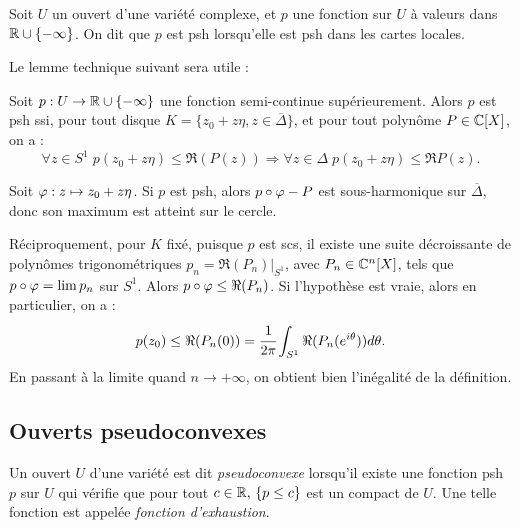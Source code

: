 \begin{defn}
	Soit $U$ un ouvert d'une variété complexe, et $p$ une fonction sur $U$ à valeurs dans $\mathbb{R}\cup \{-\infty \}$. On dit que $p$ est psh lorsqu'elle est psh dans les cartes locales.
\end{defn}

Le lemme technique suivant sera utile :

\begin{lem}
	\label{lem:techpsh} 
	Soit $p : U \to \mathbb{R}\cup \{-\infty \}$ une fonction semi-continue supérieurement. Alors $p$ est psh ssi, pour tout disque $K=\{z_0+z\eta, z\in \overline{\Delta}\}$, et pour tout polynôme $P \in \mathbb{C}[X]$, on a :
	\begin{equation*}
		\forall z \in S^1\;p(z_0+z\eta)\leq \Re(P(z)) \Rightarrow \forall z\in\Delta\;p(z_0+z\eta) \leq \Re P(z).
	\end{equation*}
\end{lem}
\begin{preuve}
	Soit $\varphi : z \mapsto z_0+z\eta$. Si $p$ est psh, alors $p\circ \varphi-P$ est sous-harmonique sur $\overline{\Delta}$, donc son maximum est atteint sur le cercle.
	
	Réciproquement, pour $K$ fixé, puisque $p$ est scs, il existe une suite décroissante de polynômes trigonométriques $p_n=\Re(P_n)|_{S^1}$, avec $P_n \in \mathbb{C}^n[X]$, tels que $p \circ \varphi = \lim p_n$ sur $S^1$. Alors $p \circ \varphi \leq \Re(P_n)$. Si l'hypothèse est vraie, alors en particulier, on a :
	\begin{equation*}
		p(z_0) \leq \Re(P_n(0)) =\cfrac{1}{2\pi}\int_{S^1}\Re(P_n(e^{i\theta}))d\theta.
	\end{equation*}
	En passant à la limite quand $n \to +\infty$, on obtient bien l'inégalité de la définition.
\end{preuve}

\subsection{Ouverts pseudoconvexes}
\begin{defn}
	Un ouvert $U$ d'une variété est dit \emph{pseudoconvexe} lorsqu'il existe une fonction psh $p$ sur $U$ qui vérifie que pour tout $c\in \mathbb{R},\,\{p \leq c\}$ est un compact de $U$. Une telle fonction est appelée \emph{fonction d'exhaustion}.
\end{defn}

